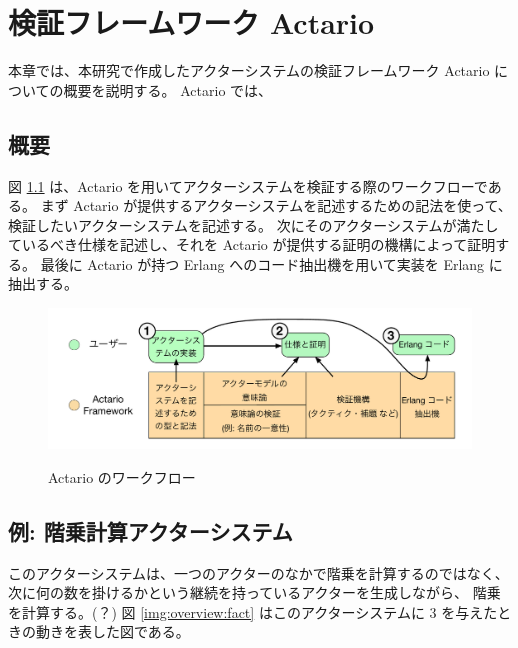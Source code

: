\chapter{検証フレームワーク Actario}
\label{chapter:overview}

本章では、本研究で作成したアクターシステムの検証フレームワーク Actario についての概要を説明する。
Actario では、

\section{概要}

図 \ref{img:overview:workflow} は、Actario を用いてアクターシステムを検証する際のワークフローである。
まず Actario が提供するアクターシステムを記述するための記法を使って、検証したいアクターシステムを記述する。
次にそのアクターシステムが満たしているべき仕様を記述し、それを Actario が提供する証明の機構によって証明する。
最後に Actario が持つ Erlang へのコード抽出機を用いて実装を Erlang に抽出する。

\begin{figure}[tp]
  \includegraphics[width=14cm]{./img/overview/workflow.pdf}
  \label{img:overview:workflow}
  \caption{Actario のワークフロー}
\end{figure}

\section{例: 階乗計算アクターシステム}

このアクターシステムは、一つのアクターのなかで階乗を計算するのではなく、
次に何の数を掛けるかという継続を持っているアクターを生成しながら、
階乗を計算する。(？)
図 \ref{img:overview:fact} はこのアクターシステムに $3$ を与えたときの動きを表した図である。

